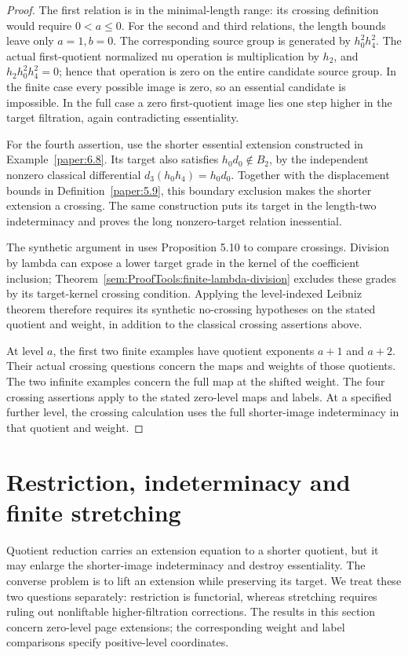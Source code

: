 \begin{proof}
The first relation is in the minimal-length range: its crossing definition would require $0<a\leq0$. For the second and third relations, the length bounds leave only $a=1,b=0$. The corresponding source group is generated by $h_0^2h_4^2$. The actual first-quotient normalized nu operation is multiplication by $h_2$, and $h_2h_0^2h_4^2=0$; hence that operation is zero on the entire candidate source group. In the finite case every possible image is zero, so an essential candidate is impossible. In the full case a zero first-quotient image lies one step higher in the target filtration, again contradicting essentiality.

For the fourth assertion, use the shorter essential extension constructed
in Example~\ref{paper:6.8}. Its target also satisfies
$h_0d_0\notin B_2$, by the independent nonzero classical differential
$d_3(h_0h_4)=h_0d_0$. Together with the displacement bounds in
Definition~\ref{paper:5.9}, this boundary exclusion makes the shorter
extension a crossing.
The same construction puts its target in the length-two indeterminacy
and proves the long nonzero-target relation inessential.

The synthetic argument in \cite[Example 5.13]{LWX126} uses
Proposition 5.10 to compare crossings. Division by lambda can expose
a lower target grade in the kernel of the coefficient inclusion;
Theorem~\ref{sem:ProofTools:finite-lambda-division} excludes these
grades by its target-kernel crossing condition. Applying the
level-indexed Leibniz theorem therefore requires its synthetic
no-crossing hypotheses on the stated quotient and weight, in addition
to the classical crossing assertions above.

At level $a$, the first two finite examples have quotient exponents
$a+1$ and $a+2$. Their actual crossing questions concern the maps
and weights of those quotients. The two infinite examples concern
the full map at the shifted weight. The four crossing assertions apply to the stated zero-level maps and labels.
At a specified further level, the crossing calculation uses the full
shorter-image indeterminacy in that quotient and weight.
\end{proof}

\section{Restriction, indeterminacy and finite stretching}

Quotient reduction carries an extension equation to a shorter quotient,
but it may enlarge the shorter-image indeterminacy and destroy
essentiality. The converse problem is to lift an extension while
preserving its target. We treat these two questions separately:
restriction is functorial, whereas stretching requires ruling out
nonliftable higher-filtration corrections.
The results in this section concern zero-level page extensions;
the corresponding weight and label comparisons specify positive-level coordinates.

